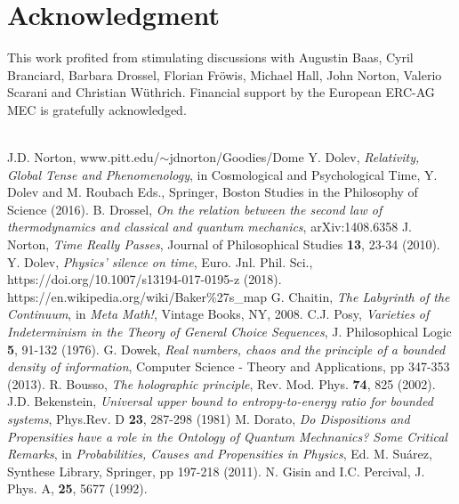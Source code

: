 \documentclass[floatfix,12pt]{article}
\begin{document}
\small
\section*{Acknowledgment} This work profited from stimulating discussions with Augustin Baas, Cyril Branciard, Barbara Drossel, Florian Fr\"owis, Michael Hall, John Norton, Valerio Scarani and Christian W\"uthrich. Financial support by the European ERC-AG MEC is gratefully acknowledged.\\ \\



\begin{thebibliography}{99}

 J.D. Norton, www.pitt.edu/$\sim$jdnorton/Goodies/Dome
 Y. Dolev, {\it Relativity, Global Tense and Phenomenology}, in Cosmological and Psychological Time, Y. Dolev and M. Roubach Eds., Springer, Boston Studies in the Philosophy of Science (2016).
 B. Drossel, {\it On the relation between the second law of thermodynamics and classical and quantum mechanics}, arXiv:1408.6358
 J. Norton, {\it Time Really Passes}, Journal of Philosophical Studies {\bf13}, 23-34 (2010). 
 Y. Dolev, {\it Physics' silence on time}, Euro. Jnl. Phil. Sci., https://doi.org/10.1007/s13194-017-0195-z (2018).
 https://en.wikipedia.org/wiki/Baker\%27s\_map 
 G. Chaitin, {\it The Labyrinth of the Continuum}, in {\it Meta Math!}, Vintage Books, NY, 2008.
 C.J. Posy, {\it Varieties of Indeterminism in the Theory of General Choice Sequences}, J. Philosophical Logic {\bf 5}, 91-132 (1976).
 G. Dowek, {\it Real numbers, chaos and the principle of a bounded density of information}, Computer Science - Theory and Applications, pp 347-353 (2013). 
 R. Bousso, {\it The holographic principle}, Rev. Mod. Phys. {\bf 74}, 825 (2002).
 J.D. Bekenstein, {\it Universal upper bound to entropy-to-energy ratio for bounded systems}, Phys.Rev. D {\bf23}, 287-298 (1981)
 M. Dorato, {\it Do Dispositions and Propensities have a role in the Ontology of Quantum Mechnanics? Some Critical Remarks}, in {\it Probabilities, Causes and Propensities in Physics}, Ed. M. Su\'arez, Synthese Library, Springer, pp 197-218 (2011).
 N. Gisin and I.C. Percival, J. Phys. A, {\bf 25}, 5677 (1992).

\end{thebibliography}
\end{document}
